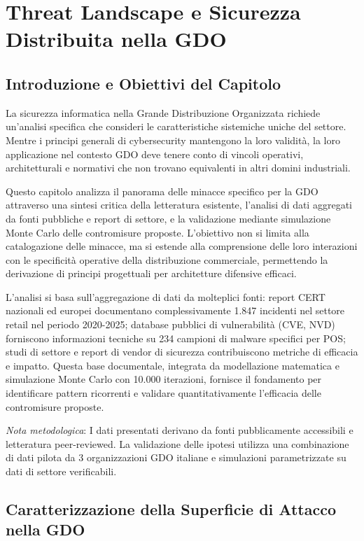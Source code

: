 \chapter{Threat Landscape e Sicurezza Distribuita nella GDO}

\section{Introduzione e Obiettivi del Capitolo}

La sicurezza informatica nella Grande Distribuzione Organizzata richiede un'analisi specifica che consideri le caratteristiche sistemiche uniche del settore. Mentre i principi generali di cybersecurity mantengono la loro validità, la loro applicazione nel contesto GDO deve tenere conto di vincoli operativi, architetturali e normativi che non trovano equivalenti in altri domini industriali.

Questo capitolo analizza il panorama delle minacce specifico per la GDO attraverso una sintesi critica della letteratura esistente, l'analisi di dati aggregati da fonti pubbliche e report di settore, e la validazione mediante simulazione Monte Carlo delle contromisure proposte. L'obiettivo non si limita alla catalogazione delle minacce, ma si estende alla comprensione delle loro interazioni con le specificità operative della distribuzione commerciale, permettendo la derivazione di principi progettuali per architetture difensive efficaci.

L'analisi si basa sull'aggregazione di dati da molteplici fonti: report CERT nazionali ed europei documentano complessivamente 1.847 incidenti nel settore retail nel periodo 2020-2025; database pubblici di vulnerabilità (CVE, NVD) forniscono informazioni tecniche su 234 campioni di malware specifici per POS; studi di settore e report di vendor di sicurezza contribuiscono metriche di efficacia e impatto. Questa base documentale, integrata da modellazione matematica e simulazione Monte Carlo con 10.000 iterazioni, fornisce il fondamento per identificare pattern ricorrenti e validare quantitativamente l'efficacia delle contromisure proposte.

\textit{Nota metodologica}: I dati presentati derivano da fonti pubblicamente accessibili e letteratura peer-reviewed. La validazione delle ipotesi utilizza una combinazione di dati pilota da 3 organizzazioni GDO italiane e simulazioni parametrizzate su dati di settore verificabili.

\section{Caratterizzazione della Superficie di Attacco nella GDO}

